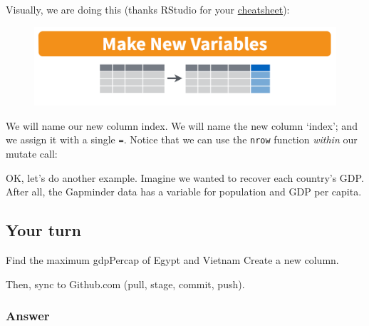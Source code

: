 \documentclass[]{book}
\newenvironment{Shaded}{\begin{snugshade}}{\end{snugshade}}
\newcommand{\KeywordTok}[1]{\textcolor[rgb]{0.13,0.29,0.53}{\textbf{#1}}}
\newcommand{\DataTypeTok}[1]{\textcolor[rgb]{0.13,0.29,0.53}{#1}}
\newcommand{\DecValTok}[1]{\textcolor[rgb]{0.00,0.00,0.81}{#1}}
\newcommand{\StringTok}[1]{\textcolor[rgb]{0.31,0.60,0.02}{#1}}
\newcommand{\OperatorTok}[1]{\textcolor[rgb]{0.81,0.36,0.00}{\textbf{#1}}}
\newcommand{\NormalTok}[1]{#1}
\theoremstyle{definition}
\theoremstyle{definition}
\theoremstyle{definition}
\theoremstyle{remark}
\begin{document}
Visually, we are doing this (thanks RStudio for your
\href{http://www.rstudio.com/wp-content/uploads/2015/02/data-wrangling-cheatsheet.pdf}{cheatsheet}):

\begin{figure}
\centering
\includegraphics{img/rstudio-cheatsheet-mutate.png}
\caption{}
\end{figure}

We will name our new column index. We will name the new column `index';
and we assign it with a single \texttt{=}. Notice that we can use the
\texttt{nrow} function \emph{within} our mutate call:

\begin{Shaded}
\end{Shaded}

OK, let's do another example. Imagine we wanted to recover each
country's GDP. After all, the Gapminder data has a variable for
population and GDP per capita.

\begin{Shaded}
\end{Shaded}

\subsection{Your turn}\label{your-turn-8}

Find the maximum gdpPercap of Egypt and Vietnam Create a new column.

Then, sync to Github.com (pull, stage, commit, push).

\subsubsection{Answer}\label{answer-1}
\end{document}
